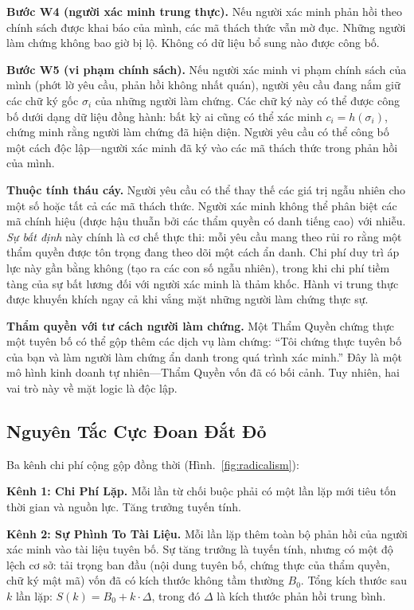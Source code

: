 \documentclass[11pt,a4paper,twocolumn]{article}
\begin{document}
\textbf{Bước W4 (người xác minh trung thực).} Nếu người xác minh phản hồi theo chính sách được khai báo của mình, các mã thách thức vẫn mờ đục. Những người làm chứng không bao giờ bị lộ. Không có dữ liệu bổ sung nào được công bố.

\textbf{Bước W5 (vi phạm chính sách).} Nếu người xác minh vi phạm chính sách của mình (phớt lờ yêu cầu, phản hồi không nhất quán), người yêu cầu đang nắm giữ các chữ ký gốc $\sigma_i$ của những người làm chứng. Các chữ ký này có thể được công bố dưới dạng dữ liệu đồng hành: bất kỳ ai cũng có thể xác minh $c_i = h(\sigma_i)$, chứng minh rằng người làm chứng đã hiện diện. Người yêu cầu có thể công bố một cách độc lập---người xác minh đã ký vào các mã thách thức trong phản hồi của mình.

\textbf{Thuộc tính tháu cáy.} Người yêu cầu có thể thay thế các giá trị ngẫu nhiên cho một số hoặc tất cả các mã thách thức. Người xác minh không thể phân biệt các mã chính hiệu (được hậu thuẫn bởi các thẩm quyền có danh tiếng cao) với nhiễu. \emph{Sự bất định} này chính là cơ chế thực thi: mỗi yêu cầu mang theo rủi ro rằng một thẩm quyền được tôn trọng đang theo dõi một cách ẩn danh. Chi phí duy trì áp lực này gần bằng không (tạo ra các con số ngẫu nhiên), trong khi chi phí tiềm tàng của sự bất lương đối với người xác minh là thảm khốc. Hành vi trung thực được khuyến khích ngay cả khi vắng mặt những người làm chứng thực sự.

\textbf{Thẩm quyền với tư cách người làm chứng.} Một Thẩm Quyền chứng thực một tuyên bố có thể gộp thêm các dịch vụ làm chứng: ``Tôi chứng thực tuyên bố của bạn và làm người làm chứng ẩn danh trong quá trình xác minh.'' Đây là một mô hình kinh doanh tự nhiên---Thẩm Quyền vốn đã có bối cảnh. Tuy nhiên, hai vai trò này về mặt logic là độc lập.

\subsection{Nguyên Tắc Cực Đoan Đắt Đỏ}

Ba kênh chi phí cộng gộp đồng thời (Hình.~\ref{fig:radicalism}):

\textbf{Kênh 1: Chi Phí Lặp.} Mỗi lần từ chối buộc phải có một lần lặp mới tiêu tốn thời gian và nguồn lực. Tăng trưởng tuyến tính.

\textbf{Kênh 2: Sự Phình To Tài Liệu.} Mỗi lần lặp thêm toàn bộ phản hồi của người xác minh vào tài liệu tuyên bố. Sự tăng trưởng là tuyến tính, nhưng có một độ lệch cơ sở: tải trọng ban đầu (nội dung tuyên bố, chứng thực của thẩm quyền, chữ ký mật mã) vốn đã có kích thước không tầm thường $B_0$. Tổng kích thước sau $k$ lần lặp: $S(k) = B_0 + k \cdot \Delta$, trong đó $\Delta$ là kích thước phản hồi trung bình.
\end{document}
